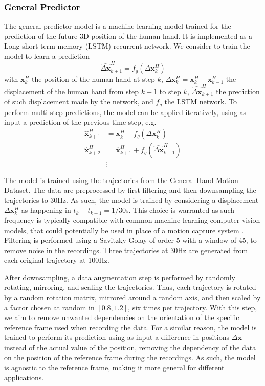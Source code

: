 \documentclass[lettersize,journal]{IEEEtran}
\newcommand{\x}{\bm x}
\begin{document}
\subsubsection{\textcolor{black}{General Predictor}}
\noindent
The general predictor model is a machine learning model trained for the prediction of the future 3D position of the human hand.
It is implemented as a Long short-term memory (LSTM) recurrent network.
We consider to train the model to learn a prediction
\begin{equation}
    \hat{\Delta\x}_{k+1}^H = f_{g}(\Delta \x^H_k)
\end{equation}
with $\x^H_k$ the position of the human hand at step $k$, $\Delta \x^H_k = \x^H_k - \x^H_{k-1}$ the displacement of the human hand from step $k-1$ to step $k$, $\hat{\Delta\x}^H_{k+1}$ the prediction of such displacement made by the network, and $f_g$ the LSTM network.
To perform multi-step predictions, the model can be applied iteratively, using as input a prediction of the previous time step, e.g.
\begin{align}
\label{eq:model_g_iterative}
    \hat{\x}^H_{k+1} &=
    \x^H_k + f_g(\Delta\x^H_k) \nonumber\\
    \hat{\x}^H_{k+2} &=
    \hat{\x}^H_{k+1} + f_g(\hat{\Delta\x}^H_{k+1}) \nonumber \\
    & \vdots
\end{align}

The model is trained using the trajectories from the General Hand Motion Dataset.
The data are preprocessed by first filtering and then downsampling the trajectories to 30Hz.
As such, the model is trained by considering a displacement $\Delta \x^H_k$ as happening in $t_k-t_{k-1}=1/30$s.
This choice is warranted as such frequency is typically compatible with common machine learning computer vision models, that could potentially be used in place of a motion capture system \cite{lugaresi_mediapipe_2019}.
Filtering is performed using a Savitzky-Golay of order 5 with a window of 45, to remove noise in the recordings.
Three trajectories at 30Hz are generated from each original trajectory at 100Hz.

After downsampling, a data augmentation step is performed by randomly rotating, mirroring, and scaling the trajectories.
Thus, each trajectory is rotated by a random rotation matrix, mirrored around a random axis, and then scaled by a factor chosen at random in $[0.8, 1.2]$, six times per trajectory.
With this step, we aim to remove unwanted dependencies on the orientation of the specific reference frame used when recording the data.
For a similar reason, the model is trained to perform its prediction using as input a difference in positions $\Delta \x$ instead of the actual value of the position, removing the dependency of the data on the position of the reference frame during the recordings.
As such, the model is agnostic to the reference frame, making it more general for different applications. 
\end{document}

